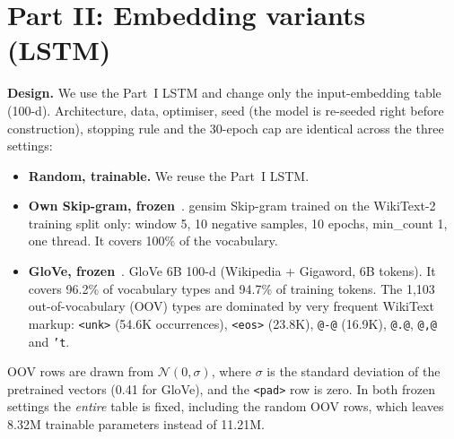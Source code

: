\documentclass[10pt,a4paper]{article}
\newcommand{\tok}[1]{\texttt{\small #1}}
\begin{document}
\section{Part II: Embedding variants (LSTM)}
\textbf{Design.} We use the Part~I LSTM and change only the input-embedding table (100-d). Architecture, data, optimiser, seed (the model is re-seeded right before construction), stopping rule and the 30-epoch cap are identical across the three settings:
\begin{itemize}
\item \textbf{Random, trainable.} We reuse the Part~I LSTM.
\item \textbf{Own Skip-gram, frozen}~\cite{mikolov2013}. gensim Skip-gram trained on the WikiText-2 training split only: window 5, 10 negative samples, 10 epochs, min\_count 1, one thread. It covers 100\% of the vocabulary.
\item \textbf{GloVe, frozen}~\cite{pennington2014}. GloVe 6B 100-d (Wikipedia + Gigaword, 6B tokens). It covers 96.2\% of vocabulary types and 94.7\% of training tokens. The 1,103 out-of-vocabulary (OOV) types are dominated by very frequent WikiText markup: \tok{<unk>} (54.6K occurrences), \tok{<eos>} (23.8K), \tok{@-@} (16.9K), \tok{@.@}, \tok{@,@} and \tok{'t}.
\end{itemize}
OOV rows are drawn from $\mathcal{N}(0,\sigma)$, where $\sigma$ is the standard deviation of the pretrained vectors (0.41 for GloVe), and the \tok{<pad>} row is zero. In both frozen settings the \emph{entire} table is fixed, including the random OOV rows, which leaves 8.32M trainable parameters instead of 11.21M.

\begin{table}[h]
\centering\small
\caption{Embedding ablation on the LSTM. The cost of training our own embeddings is reported separately from LM training. Gradient norms are measured before clipping and averaged per epoch.}
\label{tab:part2}
\setlength{\tabcolsep}{4pt}
\end{table}
\end{document}
